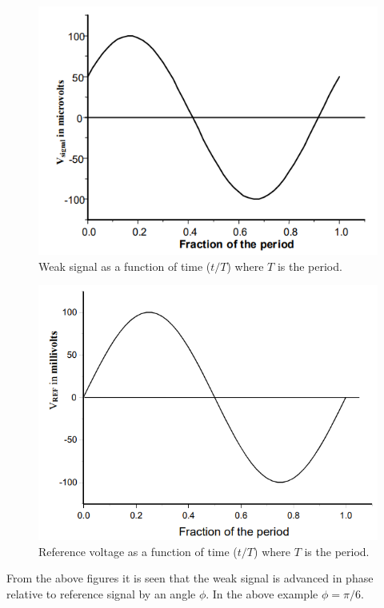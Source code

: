 \documentclass[%
 reprint,
nofootinbib,
 amsmath,amssymb,
 aps,
]{revtex4-2}
\begin{document}
    \begin{figure}
        \centering
        \includegraphics[scale = 0.69]{Figures/weaksignal.png}
        \caption{Weak signal as a function of time ($t/T$) where $T$ is the period.}
        \label{fig:weaksig}
    \end{figure}
    \begin{figure}
        \centering
        \includegraphics[scale = 0.6]{Figures/refvoltage.png}
        \caption{Reference voltage as a function of time ($t/T$) where $T$ is the period.}
        \label{fig:refvol}
    \end{figure}
    From the above figures it is seen that the weak signal is advanced in phase relative to reference signal by an angle $\phi$. In the above example $\phi = \pi/6$.
\end{document}
